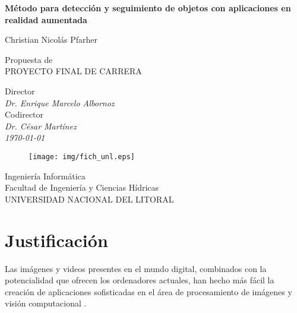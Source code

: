 \documentclass[a4paper,11pt,spanish]{article}
\begin{document}
\pagestyle{empty}

\begin{center}

	\bigskip
	\bigskip
	
	{\bf\Large Método para detección y seguimiento de objetos con aplicaciones en realidad aumentada} \\

	\bigskip
	\bigskip

	\large Christian Nicolás Pfarher\\


  	\bigskip
  	\bigskip
	
	Propuesta de \\
	{PROYECTO FINAL DE CARRERA} \\
	
	\bigskip
	
	Director\\
	\textit{Dr. Enrique Marcelo Albornoz}\\
	\bigskip
	Codirector\\
	\textit{Dr. César Martínez}\\
	
	\bigskip
	\bigskip
	\bigskip
	\bigskip
	\bigskip
	\bigskip
	\textit{\today}\\
	

	\vfill
	\begin{figure}[tbhp]
		\centerline{\texttt{[image: img/fich\_unl.eps]}}
	\end{figure}
	
  	{Ingeniería Informática}\\
  	{Facultad de Ingeniería y Ciencias Hídricas}\\
    {UNIVERSIDAD NACIONAL DEL LITORAL}	
\end{center}

\bigskip
\bigskip

\newpage

\pagestyle{plain}

\section{Justificación}
Las imágenes y videos presentes en el mundo digital, combinados con la potencialidad que ofrecen los ordenadores 
actuales, han hecho más fácil la creación de aplicaciones sofisticadas en el área de procesamiento de imágenes y visión computacional \cite{citeulike:9456628}.
\end{document}
